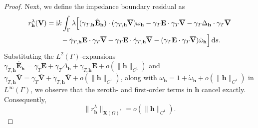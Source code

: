 \documentclass[10pt,a4paper]{amsart}
\numberwithin{equation}{section}
\begin{document}
\begin{proof}
Next, we define the impedance boundary residual as
\[
\begin{aligned}
r_{\mathbf{h}}^{\lambda}(\mathbf{V}) &= \mathrm{i}k \int_\Gamma \lambda \Bigl[ (\gamma_{T,\mathbf{h}}\hat{\mathbf{E}}_{\mathbf{h}}) \cdot (\gamma_{T,\mathbf{h}}\overline{\mathbf{V}}) \omega_{\mathbf{h}} - \gamma_T\mathbf{E}\cdot\gamma_T\overline{\mathbf{V}} - \gamma_T\Delta_{\mathbf{h}}\cdot\gamma_T\overline{\mathbf{V}} \\
&\qquad - \dot{\gamma}_{T,\mathbf{h}}\mathbf{E} \cdot \gamma_T\overline{\mathbf{V}} - \gamma_T\mathbf{E} \cdot \dot{\gamma}_{T,\mathbf{h}}\overline{\mathbf{V}} - (\gamma_T\mathbf{E}\cdot\gamma_T\overline{\mathbf{V}}) \dot{\omega}_{\mathbf{h}} \Bigr] \,\mathrm{d}s.
\end{aligned}
\]
Substituting the $L^2(\Gamma)$-expansions $\gamma_{T,\mathbf{h}}\hat{\mathbf{E}}_{\mathbf{h}} = \gamma_T\mathbf{E} + \gamma_T\Delta_{\mathbf{h}} + \dot{\gamma}_{T,\mathbf{h}}\mathbf{E} + o(\|\mathbf{h}\|_{C^1})$ and $\gamma_{T,\mathbf{h}}\overline{\mathbf{V}} = \gamma_T\overline{\mathbf{V}} + \dot{\gamma}_{T,\mathbf{h}}\overline{\mathbf{V}} + o(\|\mathbf{h}\|_{C^1})$, along with $\omega_{\mathbf{h}} = 1 + \dot{\omega}_{\mathbf{h}} + o(\|\mathbf{h}\|_{C^1})$ in $L^\infty(\Gamma)$, we observe that the zeroth- and first-order terms in $\mathbf{h}$ cancel exactly. Consequently, 
\[
\|r_{\mathbf{h}}^{\lambda}\|_{\mathbf{X}(\Omega)^*} = o(\|\mathbf{h}\|_{C^1}).
\]


\end{proof}
\end{document}
